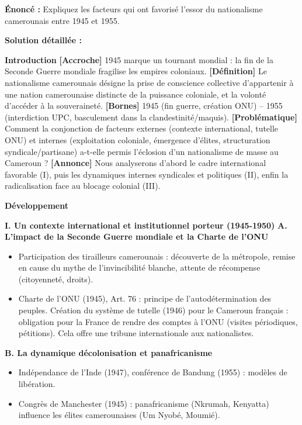 \documentclass[11pt]{article}
\newcommand{\cle}[1]{{\popxbold\color{popdark}#1}}
\begin{document}
\begin{exoresolu}
\textbf{Énoncé :} \guillemotleft Expliquez les facteurs qui ont favorisé l'essor du nationalisme camerounais entre 1945 et 1955. \guillemotright

\tcblower
\textbf{Solution détaillée :}

\textbf{Introduction}
\textbf{[Accroche]} 1945 marque un tournant mondial : la fin de la Seconde Guerre mondiale fragilise les empires coloniaux. \textbf{[Définition]} Le nationalisme camerounais désigne la prise de conscience collective d'appartenir à une nation camerounaise distincte de la puissance coloniale, et la volonté d'accéder à la souveraineté. \textbf{[Bornes]} 1945 (fin guerre, création ONU) -- 1955 (interdiction UPC, basculement dans la clandestinité/maquis). \textbf{[Problématique]} Comment la conjonction de facteurs externes (contexte international, tutelle ONU) et internes (exploitation coloniale, émergence d'élites, structuration syndicale/partisane) a-t-elle permis l'éclosion d'un nationalisme de masse au Cameroun ? \textbf{[Annonce]} Nous analyserons d'abord le cadre international favorable (I), puis les dynamiques internes syndicales et politiques (II), enfin la radicalisation face au blocage colonial (III).

\textbf{Développement}

\textbf{I. Un contexte international et institutionnel porteur (1945-1950)}
\textbf{A. L'impact de la Seconde Guerre mondiale et la Charte de l'ONU}
\begin{itemize}
    \item Participation des tirailleurs camerounais : découverte de la métropole, remise en cause du mythe de l'invincibilité blanche, attente de récompense (citoyenneté, droits).
    \item Charte de l'ONU (1945), Art. 76 : principe de l'autodétermination des peuples. Création du \cle{système de tutelle} (1946) pour le Cameroun français : obligation pour la France de rendre des comptes à l'ONU (visites périodiques, pétitions). Cela offre une \cle{tribune internationale} aux nationalistes.
\end{itemize}
\textbf{B. La dynamique décolonisation et panafricanisme}
\begin{itemize}
    \item Indépendance de l'Inde (1947), conférence de Bandung (1955) : modèles de libération.
    \item Congrès de Manchester (1945) : panafricanisme (Nkrumah, Kenyatta) influence les élites camerounaises (Um Nyobé, Moumié).
\end{itemize}


\end{exoresolu}
\end{document}
